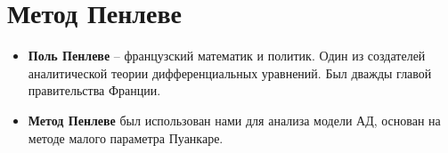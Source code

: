 \section{Метод Пенлеве}

\begin{itemize}

\item
\textbf{Поль Пенлеве} -- французский математик и политик. Один из создателей аналитической теории дифференциальных уравнений. Был дважды главой правительства Франции.

\item
\textbf{Метод Пенлеве} был использован нами для анализа модели АД, основан на методе малого параметра Пуанкаре.
\end{itemize}

